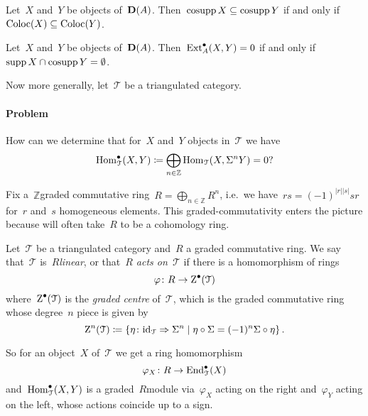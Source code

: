 \documentclass[10pt,a4paper]{article}
\begin{document}
\begin{lemma}
  Let~$X$ and~$Y$ be objects of~$\mathbf{D}(A)$. Then~$\operatorname{cosupp} X\subseteq \operatorname{cosupp} Y$ if and only if~$\operatorname{Coloc}(X)\subseteq\operatorname{Coloc}(Y)$.
\end{lemma}

\begin{corollary}
  Let~$X$ and~$Y$ be objects of~$\mathbf{D}(A)$. Then~$\operatorname{Ext}_A^\bullet(X,Y)=0$ if and only if~$\operatorname{supp} X\cap\operatorname{cosupp} Y=\emptyset$.
\end{corollary}

Now more generally, let~$\mathcal{T}$ be a triangulated category.
\paragraph{Problem} How can we determine that for~$X$ and~$Y$ objects in~$\mathcal{T}$ we have
\begin{equation}
  \operatorname{Hom}_{\mathcal{T}}^\bullet(X,Y)\coloneqq\bigoplus_{n\in\mathbb{Z}}\operatorname{Hom}_{\mathcal{T}}(X,\Sigma^nY)=0?
\end{equation}

Fix a~$\mathbb{Z}$\dash graded commutative ring~$R=\bigoplus_{n\in\mathbb{Z}}R^n$, i.e.\ we have~$rs=(-1)^{|r||s|}sr$ for~$r$ and~$s$ homogeneous elements. This graded-commutativity enters the picture because will often take~$R$ to be a cohomology ring.
\begin{definition}
  Let~$\mathcal{T}$ be a triangulated category and~$R$ a graded commutative ring. We say that~$\mathcal{T}$ is~\emph{$R$\dash linear}, or that~\emph{$R$ acts on~$\mathcal{T}$} if there is a homomorphism of rings
  \begin{equation}
    \varphi\colon R\to\operatorname{Z}^\bullet(\mathcal{T})
  \end{equation}
  where~$\operatorname{Z}^\bullet(\mathcal{T})$ is the \emph{graded centre} of~$\mathcal{T}$, which is the graded commutative ring whose degree~$n$ piece is given by
  \begin{equation}
    \operatorname{Z}^n(\mathcal{T})\coloneqq\left\{ \eta\colon\mathrm{id}_{\mathcal{T}}\Rightarrow\Sigma^n\mid\eta\circ\Sigma=(-1)^n\Sigma\circ\eta \right\}.
  \end{equation}
\end{definition}
So for an object~$X$ of~$\mathcal{T}$ we get a ring homomorphism
\begin{equation}
  \varphi_X\colon R\to\operatorname{End}_{\mathcal{T}}^\bullet(X)
\end{equation}
and~$\operatorname{Hom}_{\mathcal{T}}^\bullet(X,Y)$ is a graded~$R$\dash module via~$\varphi_X$ acting on the right and~$\varphi_Y$ acting on the left, whose actions coincide up to a sign.
\end{document}

